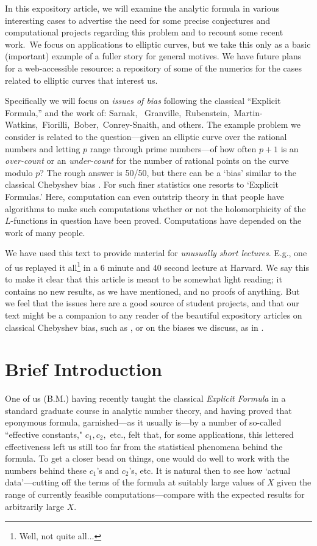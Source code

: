 \documentclass[11pt]{article}
\theoremstyle{plain}
\theoremstyle{definition}
\numberwithin{equation}{section}
\numberwithin{figure}{section}
\numberwithin{table}{section}
\begin{document}
   In this expository article, we will examine the analytic formula in various interesting cases to advertise the need for some  precise conjectures and computational projects regarding this problem and to recount some recent work.\  We focus on applications to elliptic curves, but we take this only as a basic (important) example of a fuller story for general motives.  We have  future plans for a web-accessible resource: a repository of some of the numerics for the cases related to elliptic curves that interest us.

  Specifically we will  focus on {\it issues of bias}  following the classical ``Explicit Formula,'' and the work of:
Sarnak, \ Granville,\  Rubenstein,\, Martin-Watkins,\ Fiorilli,\ Bober,\ Conrey-Snaith, and others.
 The example problem we consider is related to the question---given an elliptic curve over the rational numbers and letting  $p$ range through prime numbers---of how often  $p+1$ is an {\it over-count} or an {\it under-count} for the number of rational points on the curve modulo $p$? The rough answer is 50/50, but there can be a `bias' similar to the classical Chebyshev bias  \cite{R-S}. For such finer statistics one resorts to `Explicit Formulas.'  Here, computation can even outstrip theory in that people have algorithms to make such computations whether or not the holomorphicity of the $L$-functions in question have been proved. Computations have depended on the work of many people.


 We have used this text to provide material for {\it unusually short lectures}. %
 E.g., one of us replayed it all{\footnote{ Well, not quite all$\dots$}} in a 6 minute and 40 second lecture at Harvard. We say this to make it clear that this article is meant to be  somewhat light reading; it contains no new results, as we have mentioned, and no proofs of anything. But we feel that the issues here are a good source of student projects, and that our text might be  a companion to any reader of the beautiful expository articles on classical Chebyshev bias, such as \cite{R-S}, or on the biases we discuss, as in \cite{S}.

\hskip20pt{\small{\tableofcontents}}

\section{Brief Introduction}
 One of us (B.M.) having recently taught the classical {\it Explicit Formula} in a standard graduate course in analytic number theory, and having proved that eponymous formula, garnished---as it usually is---by a number of so-called ``effective constants," $c_1, c_2,$ etc., felt  that, for some applications, this lettered effectiveness left us still too far from  the statistical phenomena behind the formula. To get a closer bead on things, one would do well to work with the numbers behind these   $c_1$'s and $c_2$'s, etc.  It is natural then to see how `actual data'---cutting off the terms of the formula at suitably large values of $X$ given the range of currently feasible computations---compare with the expected results for arbitrarily large $X$.
\end{document}
